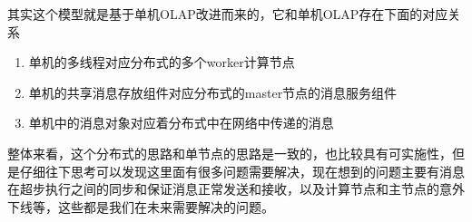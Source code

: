 \documentclass{article}
\begin{document}
其实这个模型就是基于单机OLAP改进而来的，它和单机OLAP存在下面的对应关系

\begin{enumerate}
\item 单机的多线程对应分布式的多个worker计算节点
\item 单机的共享消息存放组件对应分布式的master节点的消息服务组件
\item 单机中的消息对象对应着分布式中在网络中传递的消息
\end{enumerate}

整体来看，这个分布式的思路和单节点的思路是一致的，也比较具有可实施性，但是仔细往下思考可以发现这里面有很多问题需要解决，现在想到的问题主要有消息在超步执行之间的同步和保证消息正常发送和接收，以及计算节点和主节点的意外下线等，这些都是我们在未来需要解决的问题。
\end{document}
